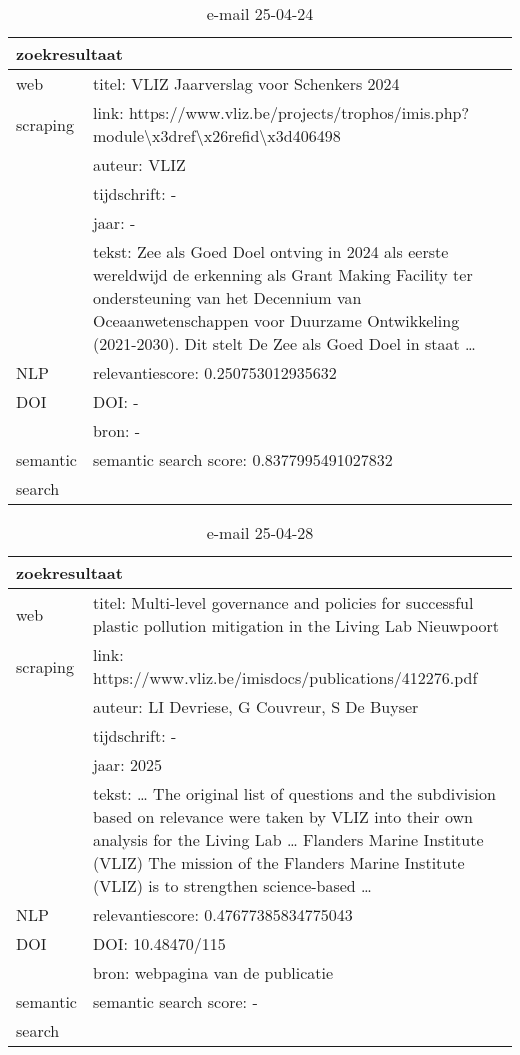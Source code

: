 \begin{table}[h!]
    \caption{e-mail 25-04-24}
    \centering
    \begin{tabularx}{\textwidth}{|p{4cm}|X|} 
        \hline
        \multicolumn{2}{|X|}{\textbf{zoekresultaat}} \\
        \hline
        web &titel: VLIZ Jaarverslag voor Schenkers 2024\\
        scraping&link: https://www.vliz.be/projects/trophos/imis.php?module\textbackslash x3dref\textbackslash x26refid\textbackslash x3d406498\\
        &auteur: VLIZ\\
        &tijdschrift: -\\
        &jaar: -\\
        &tekst: Zee als Goed Doel ontving in 2024 als eerste wereldwijd de erkenning als Grant Making Facility ter ondersteuning van het Decennium van Oceaanwetenschappen voor Duurzame Ontwikkeling (2021-2030). Dit stelt De Zee als Goed Doel in staat …\\
        \hline
        NLP&relevantiescore: 0.250753012935632\\
        \hline
        DOI&DOI: -\\
        &bron: -\\
        \hline
        semantic&semantic search score: 0.8377995491027832\\
        search&\\
        \hline
    \end{tabularx}
    \label{table:email20250424}
\end{table}
\begin{table}[h!]
    \caption{e-mail 25-04-28}
    \centering
    \begin{tabularx}{\textwidth}{|p{4cm}|X|} 
        \hline
        \multicolumn{2}{|X|}{\textbf{zoekresultaat}} \\
        \hline
        web &titel: Multi-level governance and policies for successful plastic pollution mitigation in the Living Lab Nieuwpoort\\
        scraping&link: https://www.vliz.be/imisdocs/publications/412276.pdf\\
        &auteur: LI Devriese, G Couvreur, S De Buyser\\
        &tijdschrift: -\\
        &jaar: 2025\\
        &tekst: … The original list of questions and the subdivision based on relevance were taken by VLIZ into their own analysis for the Living Lab … Flanders Marine Institute (VLIZ) The mission of the Flanders Marine Institute (VLIZ) is to strengthen science-based …\\
        \hline
        NLP&relevantiescore: 0.47677385834775043\\
        \hline
        DOI&DOI: 10.48470/115\\
        &bron: webpagina van de publicatie\\
        \hline
        semantic&semantic search score: -\\
        search&\\
        \hline
    \end{tabularx}
    \label{table:email20250428}
\end{table}
